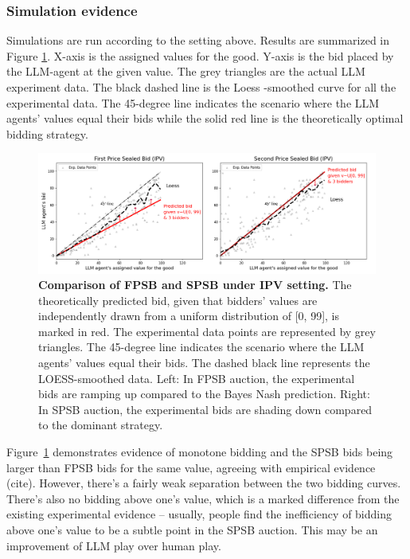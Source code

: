 \documentclass{article} %
\begin{document}
\subsubsection{Simulation evidence}
Simulations are run according to the setting above. 
Results are summarized in Figure \ref{fig:fpsb-plan}. 
X-axis is the assigned values for the good. 
Y-axis is the bid placed by the LLM-agent at the given value.
The grey triangles are the actual LLM experiment data. The black dashed line is the Loess -smoothed curve for all the experimental data. 
The 45-degree line indicates
the scenario where the LLM agents’ values equal their bids while the solid red line is the theoretically optimal bidding strategy. 

\begin{figure}[h]
    \centering \includegraphics[width=\linewidth]{Figs/ipv.png}
    \caption{\textbf{ Comparison of FPSB and SPSB under IPV setting.} The theoretically predicted bid, given that bidders' values are independently drawn from a uniform distribution of [0, 99], is marked in red. The experimental data points are represented by grey triangles. The 45-degree line indicates the scenario where the LLM agents' values equal their bids. The dashed black line represents the LOESS-smoothed data. Left: In FPSB auction, the experimental bids are ramping up compared to the Bayes Nash prediction. Right: In SPSB auction, the experimental bids are shading down compared to the dominant strategy.}
    \label{fig:fpsb-plan}

\end{figure}

Figure~\ref{fig:fpsb-plan} demonstrates evidence of monotone bidding and the SPSB bids being larger than FPSB bids for the same value, agreeing with empirical evidence (cite). 
However, there's a fairly weak separation between the two bidding curves. 
There's also no bidding above one's value, which is a marked difference from the existing experimental evidence -- usually, people find the inefficiency of bidding above one's value to be a subtle point in the SPSB auction. 
This may be an improvement of LLM play over human play. 
\end{document}
